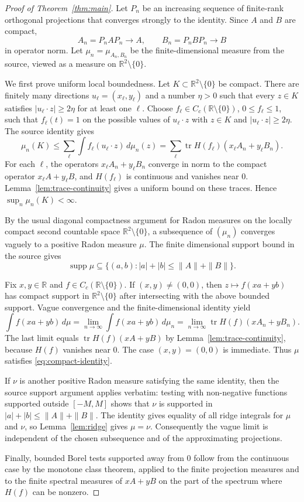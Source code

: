 \documentclass[11pt]{article}
\newcommand{\R}{\mathbb R}
\newcommand{\tr}{\operatorname{tr}}
\newcommand{\supp}{\operatorname{supp}}
\begin{document}
\begin{proof}[Proof of Theorem~\ref{thm:main}]
Let $P_n$ be an increasing sequence of finite-rank orthogonal projections that
converges strongly to the identity.  Since $A$ and $B$ are compact,
\[
  A_n=P_nAP_n\to A,\qquad B_n=P_nBP_n\to B
\]
in operator norm.  Let $\mu_n=\mu_{A_n,B_n}$ be the finite-dimensional measure
from the source, viewed as a measure on $\R^2\setminus\{0\}$.

We first prove uniform local boundedness.  Let
$K\subset\R^2\setminus\{0\}$ be compact.  There are finitely many
directions $u_\ell=(x_\ell,y_\ell)$ and a number $\eta>0$ such that every
$z\in K$ satisfies $|u_\ell\cdot z|\ge 2\eta$ for at least one $\ell$.  Choose
$f_\ell\in C_c(\R\setminus\{0\})$, $0\le f_\ell\le1$, such that
$f_\ell(t)=1$ on the possible values of $u_\ell\cdot z$ with
$z\in K$ and $|u_\ell\cdot z|\ge2\eta$.  The source identity gives
\[
  \mu_n(K)
  \le \sum_\ell \int f_\ell(u_\ell\cdot z)\,d\mu_n(z)
  =\sum_\ell \tr H(f_\ell)(x_\ell A_n+y_\ell B_n).
\]
For each $\ell$, the operators $x_\ell A_n+y_\ell B_n$ converge in norm to
the compact operator $x_\ell A+y_\ell B$, and $H(f_\ell)$ is continuous and
vanishes near $0$.  Lemma~\ref{lem:trace-continuity} gives a uniform bound on
these traces.  Hence $\sup_n\mu_n(K)<\infty$.

By the usual diagonal compactness argument for Radon measures on the
locally compact second countable space $\R^2\setminus\{0\}$, a subsequence of
$(\mu_n)$ converges vaguely to a positive Radon measure $\mu$.  The finite
dimensional support bound in the source gives
\[
  \supp\mu\subseteq \{(a,b): |a|+|b|\le \|A\|+\|B\|\}.
\]

Fix $x,y\in\R$ and $f\in C_c(\R\setminus\{0\})$.  If $(x,y)\ne(0,0)$, then
$z\mapsto f(xa+yb)$ has compact support in $\R^2\setminus\{0\}$ after
intersecting with the above bounded support.  Vague convergence and the
finite-dimensional identity yield
\[
  \int f(xa+yb)\,d\mu
  =\lim_{n\to\infty}\int f(xa+yb)\,d\mu_n
  =\lim_{n\to\infty}\tr H(f)(xA_n+yB_n).
\]
The last limit equals $\tr H(f)(xA+yB)$ by Lemma~\ref{lem:trace-continuity},
because $H(f)$ vanishes near $0$.  The case $(x,y)=(0,0)$ is immediate.
Thus $\mu$ satisfies \eqref{eq:compact-identity}.

If $\nu$ is another positive Radon measure satisfying the same identity, then
the source support argument applies verbatim: testing with non-negative
functions supported outside $[-M,M]$ shows that
$\nu$ is supported in $|a|+|b|\le \|A\|+\|B\|$.  The identity gives equality
of all ridge integrals for $\mu$ and $\nu$, so Lemma~\ref{lem:ridge} gives
$\mu=\nu$.  Consequently the vague limit is independent of the chosen
subsequence and of the approximating projections.

Finally, bounded Borel tests supported away from $0$ follow from the continuous
case by the monotone class theorem, applied to the finite projection measures
and to the finite spectral measures of $xA+yB$ on the part of the spectrum
where $H(f)$ can be nonzero.
\end{proof}
\end{document}
